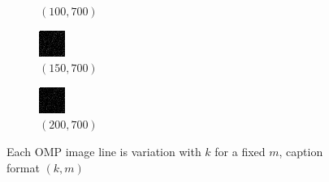\documentclass[a4paper, landscape]{article}
\begin{document}
\begin{figure}[H]
\begin{subfigure}{0.12\linewidth}
        \caption{$(100, 700)$}
    \end{subfigure}
    \begin{subfigure}{0.12\linewidth}
        \centering
        \includegraphics[width=\linewidth]{omp/k = 150, m = 700.png}
        \caption{$(150, 700)$}
    \end{subfigure}
    \begin{subfigure}{0.12\linewidth}
        \centering
        \includegraphics[width=\linewidth]{omp/k = 200, m = 700.png}
        \caption{$(200, 700)$}
    \end{subfigure}
    \caption{Each OMP image line is variation with $k$ for a fixed $m$, caption format $(k, m)$}
    \label{fig:m}
\end{figure}
\end{document}
